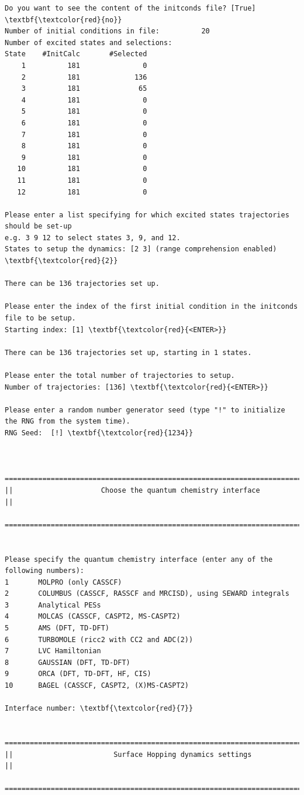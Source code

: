 \documentclass[a4paper,11pt,DIV=15,openany]{scrbook}
\begin{document}
\begin{oframed}
\begin{Verbatim}[commandchars=\\\{\}]
Do you want to see the content of the initconds file? [True] \textbf{\textcolor{red}{no}}
Number of initial conditions in file:          20
Number of excited states and selections:
State    #InitCalc       #Selected
    1          181               0
    2          181             136
    3          181              65
    4          181               0
    5          181               0
    6          181               0
    7          181               0
    8          181               0
    9          181               0
   10          181               0
   11          181               0
   12          181               0

Please enter a list specifying for which excited states trajectories should be set-up
e.g. 3 9 12 to select states 3, 9, and 12.
States to setup the dynamics: [2 3] (range comprehension enabled) \textbf{\textcolor{red}{2}}

There can be 136 trajectories set up.

Please enter the index of the first initial condition in the initconds file to be setup.
Starting index: [1] \textbf{\textcolor{red}{<ENTER>}}

There can be 136 trajectories set up, starting in 1 states.

Please enter the total number of trajectories to setup.
Number of trajectories: [136] \textbf{\textcolor{red}{<ENTER>}}

Please enter a random number generator seed (type "!" to initialize the RNG from the system time).
RNG Seed:  [!] \textbf{\textcolor{red}{1234}}


  ================================================================================
||                     Choose the quantum chemistry interface                     ||
  ================================================================================


Please specify the quantum chemistry interface (enter any of the following numbers):
1       MOLPRO (only CASSCF)
2       COLUMBUS (CASSCF, RASSCF and MRCISD), using SEWARD integrals
3       Analytical PESs
4       MOLCAS (CASSCF, CASPT2, MS-CASPT2)
5       AMS (DFT, TD-DFT)
6       TURBOMOLE (ricc2 with CC2 and ADC(2))
7       LVC Hamiltonian
8       GAUSSIAN (DFT, TD-DFT)
9       ORCA (DFT, TD-DFT, HF, CIS)
10      BAGEL (CASSCF, CASPT2, (X)MS-CASPT2)

Interface number: \textbf{\textcolor{red}{7}}

  ================================================================================
||                        Surface Hopping dynamics settings                       ||
  ================================================================================



\end{Verbatim}
\end{oframed}
\end{document}
